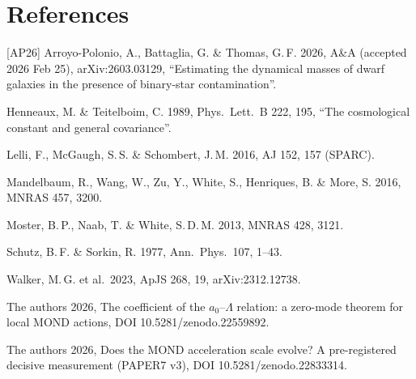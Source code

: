 \documentclass[10pt]{article}
\begin{document}
\section*{References}
\small
[AP26] Arroyo-Polonio, A., Battaglia, G. \& Thomas, G.\,F. 2026, A\&A (accepted 2026 Feb 25), arXiv:2603.03129, ``Estimating the dynamical masses of dwarf galaxies in the presence of binary-star contamination''.\par
[HT89] Henneaux, M. \& Teitelboim, C. 1989, Phys.\ Lett.\ B 222, 195, ``The cosmological constant and general covariance''.\par
[LMS16] Lelli, F., McGaugh, S.\,S. \& Schombert, J.\,M. 2016, AJ 152, 157 (SPARC).\par
[M16] Mandelbaum, R., Wang, W., Zu, Y., White, S., Henriques, B. \& More, S. 2016, MNRAS 457, 3200.\par
[MNW13] Moster, B.\,P., Naab, T. \& White, S.\,D.\,M. 2013, MNRAS 428, 3121.\par
[SS77] Schutz, B.\,F. \& Sorkin, R. 1977, Ann.\ Phys.\ 107, 1--43.\par
[W23] Walker, M.\,G. et al.\ 2023, ApJS 268, 19, arXiv:2312.12738.\par
[Z26a] The authors 2026, The coefficient of the $a_0$--$\Lambda$ relation: a zero-mode theorem for local MOND actions, DOI 10.5281/zenodo.22559892.\par
[Z26c] The authors 2026, Does the MOND acceleration scale evolve? A pre-registered decisive measurement (PAPER7 v3), DOI 10.5281/zenodo.22833314.\par
\end{document}
